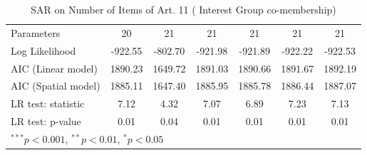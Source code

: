\begin{table}[!h]
\begin{center}
\begin{tabular}{l c c c c c c }
Parameters              & 20           & 21           & 21           & 21           & 21           & 21           \\
Log Likelihood          & -922.55      & -802.70      & -921.98      & -921.89      & -922.22      & -922.53      \\
AIC (Linear model)      & 1890.23      & 1649.72      & 1891.03      & 1890.66      & 1891.67      & 1892.19      \\
AIC (Spatial model)     & 1885.11      & 1647.40      & 1885.95      & 1885.78      & 1886.44      & 1887.07      \\
LR test: statistic      & 7.12         & 4.32         & 7.07         & 6.89         & 7.23         & 7.13         \\
LR test: p-value        & 0.01         & 0.04         & 0.01         & 0.01         & 0.01         & 0.01         \\
\bottomrule
\multicolumn{7}{l}{\scriptsize{$^{***}p<0.001$, $^{**}p<0.01$, $^*p<0.05$}}
\end{tabular}
\caption{SAR on Number of Items of Art. 11 ( Interest Group co-membership)}
\label{table:coefficients}
\end{center}
\end{table}

